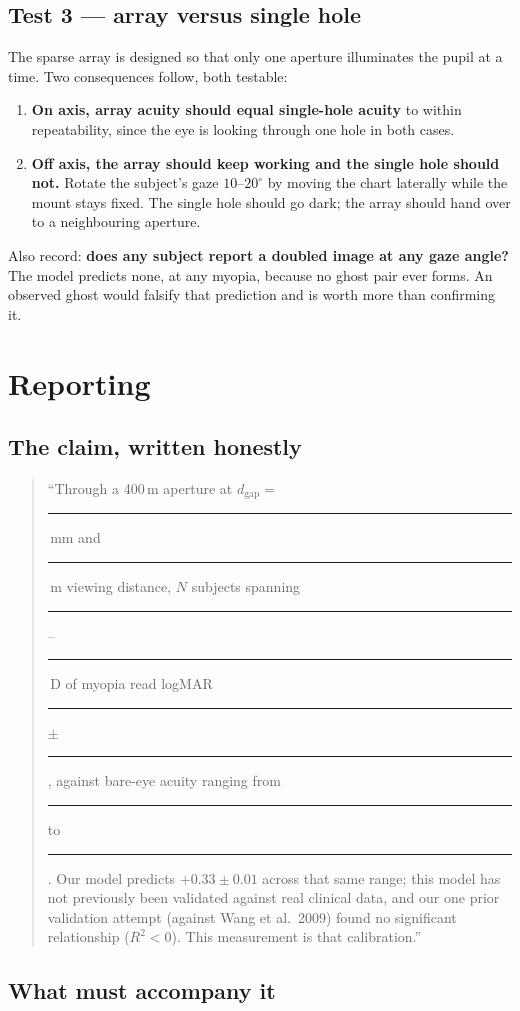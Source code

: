 \documentclass[11pt]{report}
\begin{document}
\section{Test 3 --- array versus single hole}

The sparse array is designed so that only one aperture illuminates the pupil at a time. Two
consequences follow, both testable:

\begin{enumerate}[leftmargin=1.2cm]
\item \textbf{On axis, array acuity should equal single-hole acuity} to within repeatability, since
the eye is looking through one hole in both cases.
\item \textbf{Off axis, the array should keep working and the single hole should not.} Rotate the
subject's gaze $10$--$20^\circ$ by moving the chart laterally while the mount stays fixed. The single
hole should go dark; the array should hand over to a neighbouring aperture.
\end{enumerate}

Also record: \textbf{does any subject report a doubled image at any gaze angle?} The model predicts
none, at any myopia, because no ghost pair ever forms. An observed ghost would falsify that
prediction and is worth more than confirming it.

\chapter{Reporting}

\section{The claim, written honestly}

\begin{quote}
``Through a 400\,\textmu m aperture at $d_{\text{gap}} = $\,\rule{1cm}{0.4pt}\,mm and
\rule{1cm}{0.4pt}\,m viewing distance, $N$ subjects spanning \rule{1cm}{0.4pt}--\rule{1cm}{0.4pt}\,D
of myopia read logMAR \rule{1cm}{0.4pt} $\pm$ \rule{1cm}{0.4pt}, against bare-eye acuity ranging from
\rule{1cm}{0.4pt} to \rule{1cm}{0.4pt}. Our model predicts $+0.33 \pm 0.01$ across that same range;
this model has not previously been validated against real clinical data, and our one prior validation
attempt (against Wang et al.\ 2009) found no significant relationship ($R^2<0$). This measurement is
that calibration.''
\end{quote}

\section{What must accompany it}
\end{document}
